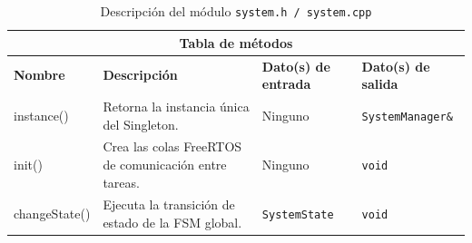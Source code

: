 \begin{table}[h!]
\begin{tabular}{|p{2.8cm}|p{5.5cm}|p{2.8cm}|p{1.7cm}|}
\hline
\multicolumn{4}{|c|}{\textbf{Tabla de métodos}} \\
\hline
\textbf{Nombre} & \textbf{Descripción} & \textbf{Dato(s) de entrada} & \textbf{Dato(s) de salida} \\
\hline
instance() & Retorna la instancia única del Singleton. & Ninguno & \texttt{SystemManager\&} \\
\hline
init() & Crea las colas FreeRTOS de comunicación entre tareas. & Ninguno & \texttt{void} \\
\hline
changeState() & Ejecuta la transición de estado de la FSM global. & \texttt{SystemState} & \texttt{void} \\
\hline
\end{tabular}
\caption{Descripción del módulo \texttt{system.h / system.cpp}}
\label{tab:module_system}
\end{table}

